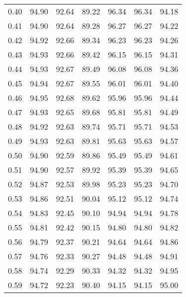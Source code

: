 \begin{tabular}{|c|c|c|c|c|c|c|}
      0.40 &     94.90 &     92.64 &      89.22 &   96.34 &      96.34 &         94.18 \\
      0.41 &     94.90 &     92.64 &      89.28 &   96.27 &      96.27 &         94.22 \\
      0.42 &     94.92 &     92.66 &      89.34 &   96.23 &      96.23 &         94.26 \\
      0.43 &     94.93 &     92.66 &      89.42 &   96.15 &      96.15 &         94.31 \\
      0.44 &     94.93 &     92.67 &      89.49 &   96.08 &      96.08 &         94.36 \\
      0.45 &     94.94 &     92.67 &      89.55 &   96.01 &      96.01 &         94.40 \\
      0.46 &     94.95 &     92.68 &      89.62 &   95.96 &      95.96 &         94.44 \\
      0.47 &     94.93 &     92.65 &      89.68 &   95.81 &      95.81 &         94.49 \\
      0.48 &     94.92 &     92.63 &      89.74 &   95.71 &      95.71 &         94.53 \\
      0.49 &     94.93 &     92.63 &      89.81 &   95.63 &      95.63 &         94.57 \\
      0.50 &     94.90 &     92.59 &      89.86 &   95.49 &      95.49 &         94.61 \\
      0.51 &     94.90 &     92.57 &      89.92 &   95.39 &      95.39 &         94.65 \\
      0.52 &     94.87 &     92.53 &      89.98 &   95.23 &      95.23 &         94.70 \\
      0.53 &     94.86 &     92.51 &      90.04 &   95.12 &      95.12 &         94.74 \\
      0.54 &     94.83 &     92.45 &      90.10 &   94.94 &      94.94 &         94.78 \\
      0.55 &     94.81 &     92.42 &      90.15 &   94.80 &      94.80 &         94.82 \\
      0.56 &     94.79 &     92.37 &      90.21 &   94.64 &      94.64 &         94.86 \\
      0.57 &     94.76 &     92.33 &      90.27 &   94.48 &      94.48 &         94.91 \\
      0.58 &     94.74 &     92.29 &      90.33 &   94.32 &      94.32 &         94.95 \\
      0.59 &     94.72 &     92.23 &      90.40 &   94.15 &      94.15 &         95.00 \\

\end{tabular}

